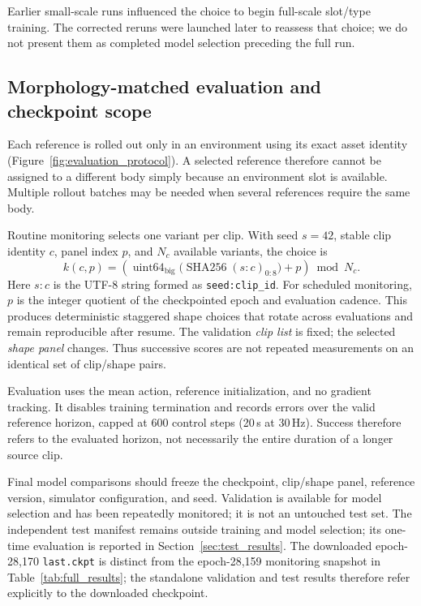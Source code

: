 Earlier small-scale runs influenced the choice to begin full-scale slot/type
training. The corrected reruns were launched later to reassess that choice;
we do not present them as completed model selection preceding the full run.

\subsection{Morphology-matched evaluation and checkpoint scope}\label{sec:evaluation_protocol}

Each reference is rolled out only in an environment using its exact asset
identity (Figure~\ref{fig:evaluation_protocol}). A selected reference
therefore cannot be assigned to a different body simply because an
environment slot is available. Multiple rollout batches may be needed when
several references require the same body.

Routine monitoring selects one variant per clip. With seed $s=42$, stable
clip identity $c$, panel index $p$, and $N_c$ available variants, the choice is
\begin{equation}
    k(c,p) =
    \left(
       \operatorname{uint64}_{\mathrm{big}}
       \bigl(\operatorname{SHA256}(s\!:\!c)_{0:8}\bigr)
       +p
    \right)\bmod N_c .
    \label{eq:shape_panel}
\end{equation}
Here $s\!:\!c$ is the UTF-8 string formed as \texttt{seed:clip\_id}.
For scheduled monitoring, $p$ is the integer quotient of the checkpointed
epoch and evaluation cadence. This produces deterministic staggered shape
choices that rotate across evaluations and remain reproducible after resume.
The validation \emph{clip list} is fixed; the selected \emph{shape panel}
changes. Thus successive scores are not repeated measurements on an
identical set of clip/shape pairs.

Evaluation uses the mean action, reference initialization, and no gradient
tracking. It disables training termination and records errors over the
valid reference horizon, capped at 600 control steps (20\,s at 30\,Hz).
Success therefore refers to the evaluated horizon, not necessarily the
entire duration of a longer source clip.

Final model comparisons should freeze the checkpoint, clip/shape panel,
reference version, simulator configuration, and seed. Validation is available
for model selection and has been repeatedly monitored; it is not an untouched
test set. The independent test manifest remains outside training and model
selection; its one-time evaluation is reported in
Section~\ref{sec:test_results}. The downloaded epoch-28,170
\texttt{last.ckpt} is distinct from the epoch-28,159 monitoring snapshot
in Table~\ref{tab:full_results}; the standalone validation and test results
therefore refer explicitly to the downloaded checkpoint.

